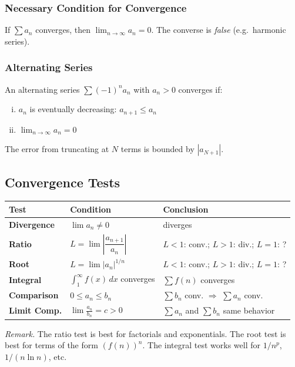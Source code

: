 \documentclass[11pt, letterpaper]{article}
\theoremstyle{plain}
\newenvironment{remark}{\smallskip\noindent\textit{Remark.}}{\smallskip}
\begin{document}
\subsubsection*{Necessary Condition for Convergence}
If $\sum a_n$ converges, then $\lim_{n\to\infty} a_n = 0$.
The converse is \emph{false} (e.g.\ harmonic series).

\subsubsection*{Alternating Series}
An alternating series $\sum (-1)^n a_n$ with $a_n > 0$ converges if:
\begin{enumerate}[(i)]
    \item $a_n$ is eventually decreasing: $a_{n+1} \leq a_n$
    \item $\lim_{n\to\infty} a_n = 0$
\end{enumerate}
The error from truncating at $N$ terms is bounded by $|a_{N+1}|$.


\subsection{Convergence Tests}

\begin{center}
\begin{tabular}{lll}
    \toprule
    Test & Condition & Conclusion \\
    \midrule
    \textbf{Divergence} & $\lim a_n \neq 0$ & diverges \\[4pt]
    \textbf{Ratio} & $L = \lim\left|\dfrac{a_{n+1}}{a_n}\right|$ &
        $L<1$: conv.; $L>1$: div.; $L=1$: ? \\[8pt]
    \textbf{Root} & $L = \lim |a_n|^{1/n}$ &
        $L<1$: conv.; $L>1$: div.; $L=1$: ? \\[4pt]
    \textbf{Integral} & $\int_1^\infty f(x)\,dx$ converges & $\sum f(n)$ converges \\[4pt]
    \textbf{Comparison} & $0 \leq a_n \leq b_n$ &
        $\sum b_n$ conv. $\Rightarrow$ $\sum a_n$ conv. \\[4pt]
    \textbf{Limit Comp.} & $\lim \frac{a_n}{b_n} = c > 0$ &
        $\sum a_n$ and $\sum b_n$ same behavior \\
    \bottomrule
\end{tabular}
\end{center}

\begin{remark}
    The ratio test is best for factorials and exponentials.
    The root test is best for terms of the form $(f(n))^n$.
    The integral test works well for $1/n^p$, $1/(n\ln n)$, etc.
\end{remark}
\end{document}
